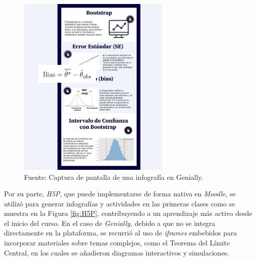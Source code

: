 \documentclass[letter,oneside,12pt,spanish]{report}
\begin{document}
\begin{figure}[ht]
	\centering
	\includegraphics[width=0.65\textwidth]{Figs/Infografia_Genially.pdf}
	\label{fig:Igenially}
	\\Fuente: Captura de pantalla de una infografía en Genially.
\end{figure}

Por su parte, \textit{H5P}, que puede implementarse de forma nativa en \textit{Moodle}, se utilizó para generar infografías y actividades en las primeras clases como se muestra en la Figura \ref{fig:H5P}, contribuyendo a un aprendizaje más activo desde el inicio del curso. En el caso de \textit{Genially}, debido a que no se integra directamente en la plataforma, se recurrió al uso de \textit{iframes} embebidos para incorporar materiales sobre temas complejos, como el Teorema del Límite Central, en los cuales se añadieron diagramas interactivos y simulaciones.
\end{document}
